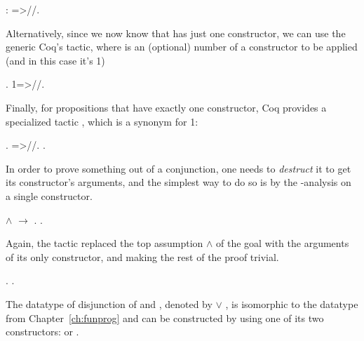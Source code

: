 \begin{coqdoccode}
\coqdocemptyline
\coqdocnoindent
{}: =>//.\coqdoceol
\coqdocemptyline
\end{coqdoccode}


Alternatively, since we now know that  has just one constructor,
we can use the generic Coq's  
tactic, where  is an (optional) number of a constructor to be
applied (and in this case it's 1)


\begin{coqdoccode}
\coqdocemptyline
\coqdocnoindent
{}.\coqdoceol
\coqdocnoindent
{} 1=>//.\coqdoceol
\coqdocemptyline
\end{coqdoccode}


Finally, for propositions that have exactly one constructor, Coq
provides a specialized tactic , which is a synonym for
 1:
 \begin{coqdoccode}
\coqdocemptyline
\coqdocnoindent
{}. =>//.\coqdoceol
\coqdocnoindent
{}.\coqdoceol
\coqdocemptyline
\end{coqdoccode}


In order to prove something out of a conjunction, one needs to
\textit{destruct} it to get its constructor's arguments, and the simplest way
to do so is by the -analysis on a single constructor.


\begin{coqdoccode}
\coqdocemptyline
\coqdocnoindent
{}  \ensuremath{\land}  \ensuremath{\rightarrow} .\coqdoceol
\coqdocnoindent
{}.\coqdoceol
\coqdocemptyline
\end{coqdoccode}


Again, the tactic  replaced the top assumption  \ensuremath{\land}  of the
goal with the arguments of its only constructor,  and  making
the rest of the proof trivial.
\begin{coqdoccode}
\coqdocemptyline
\coqdocnoindent
{}.\coqdoceol
\coqdocnoindent
{}.\coqdoceol
\coqdocemptyline
\end{coqdoccode}
The datatype of disjunction of  and , denoted by  \ensuremath{\lor} , is
isomorphic to the  datatype from Chapter~\ref{ch:funprog} and
can be constructed by using one of its two constructors: 
or .


